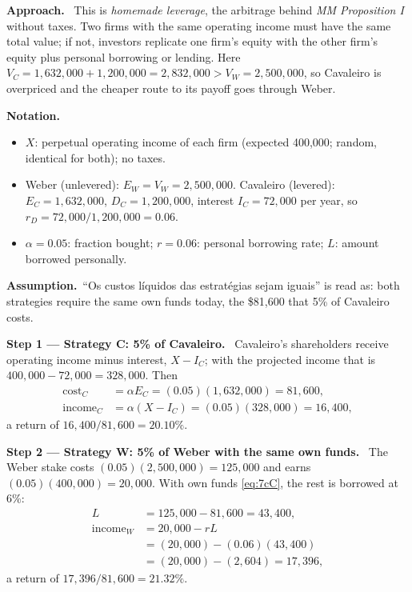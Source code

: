 \documentclass[11pt,a4paper]{article}
\numberwithin{equation}{section}
\newcommand{\notation}{\par\smallskip\noindent\textbf{Notation.}}
\newcommand{\step}[2]{\par\smallskip\noindent\textbf{Step #1 --- #2.}~}
\newcommand{\assumption}{\par\smallskip\noindent\textbf{Assumption.}~}
\newcommand{\approach}{\par\smallskip\noindent\textbf{Approach.}~}
\begin{document}
\approach
This is \emph{homemade leverage}, the arbitrage behind \emph{MM Proposition I} without taxes.
Two firms with the same operating income must have the same total value; if not, investors
replicate one firm's equity with the other firm's equity plus personal borrowing or lending. Here
$V_C=1{,}632{,}000+1{,}200{,}000=2{,}832{,}000>V_W=2{,}500{,}000$, so Cavaleiro is overpriced and
the cheaper route to its payoff goes through Weber.

\notation
\begin{itemize}
  \item $X$: perpetual operating income of each firm (expected 400{,}000; random, identical for both); no taxes.
  \item Weber (unlevered): $E_W=V_W=2{,}500{,}000$. Cavaleiro (levered): $E_C=1{,}632{,}000$, $D_C=1{,}200{,}000$, interest $I_C=72{,}000$ per year, so $r_D=72{,}000/1{,}200{,}000=0.06$.
  \item $\alpha=0.05$: fraction bought; $r=0.06$: personal borrowing rate; $L$: amount borrowed personally.
\end{itemize}

\assumption ``Os custos líquidos das estratégias sejam iguais'' is read as: both strategies
require the same own funds today, the \$81{,}600 that 5\% of Cavaleiro costs.

\step{1}{Strategy C: 5\% of Cavaleiro} Cavaleiro's shareholders receive operating income minus
interest, $X-I_C$; with the projected income that is $400{,}000-72{,}000=328{,}000$. Then
\begin{align}
  \text{cost}_C &= \alpha E_C=(0.05)(1{,}632{,}000)=81{,}600, \label{eq:7cC}\\
  \text{income}_C &= \alpha (X-I_C)=(0.05)(328{,}000)=16{,}400, \label{eq:7iC}
\end{align}
a return of $16{,}400/81{,}600=20.10\%$.

\step{2}{Strategy W: 5\% of Weber with the same own funds} The Weber stake costs
$(0.05)(2{,}500{,}000)=125{,}000$ and earns $(0.05)(400{,}000)=20{,}000$. With own funds
\eqref{eq:7cC}, the rest is borrowed at 6\%:
\begin{align}
  L &= 125{,}000-81{,}600 = 43{,}400, \label{eq:7L}\\
  \text{income}_W &= 20{,}000 - rL \nonumber\\
      &= (20{,}000)-(0.06)(43{,}400) \nonumber\\
      &= (20{,}000)-(2{,}604) = 17{,}396, \label{eq:7iW}
\end{align}
a return of $17{,}396/81{,}600=21.32\%$.
\end{document}
